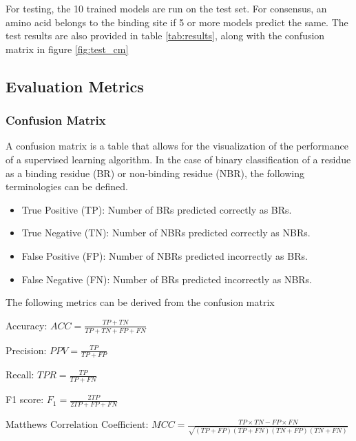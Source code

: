 \documentclass[journal=jacsat,manuscript=article]{achemso}
\begin{document}
For testing, the 10 trained models are run on the test set. For consensus, an amino acid belongs to the binding site if 5 or more models predict the same. The test results are also provided in table \ref{tab:results}, along with the confusion matrix in figure \ref{fig:test_cm}

\subsection{Evaluation Metrics}
\subsubsection{Confusion Matrix}
A confusion matrix is a table that allows for the visualization of the performance of a supervised learning algorithm. In the case of binary classification of a residue as a binding residue (BR) or non-binding residue (NBR), the following terminologies can be defined.
\begin{itemize}
    \item True Positive (TP): Number of BRs predicted correctly as BRs.
    \item True Negative (TN): Number of NBRs predicted correctly as NBRs.
    \item False Positive (FP): Number of NBRs predicted incorrectly as BRs.
    \item False Negative (FN): Number of BRs predicted incorrectly as NBRs.
\end{itemize}

\noindent The following metrics can be derived from the confusion matrix

Accuracy: ${ACC} = \frac{TP + TN}{TP + TN + FP + FN}$

Precision: ${PPV} = \frac{TP}{TP + FP}$

Recall: ${TPR} = \frac{TP}{TP + FN}$

F1 score: ${F_1} = \frac{2TP}{2TP + FP + FN}$

Matthews Correlation Coefficient: ${MCC} = \frac{TP \times TN - FP \times FN}{\sqrt{(TP + FP)(TP + FN)(TN + FP)(TN + FN)}}$
\end{document}
